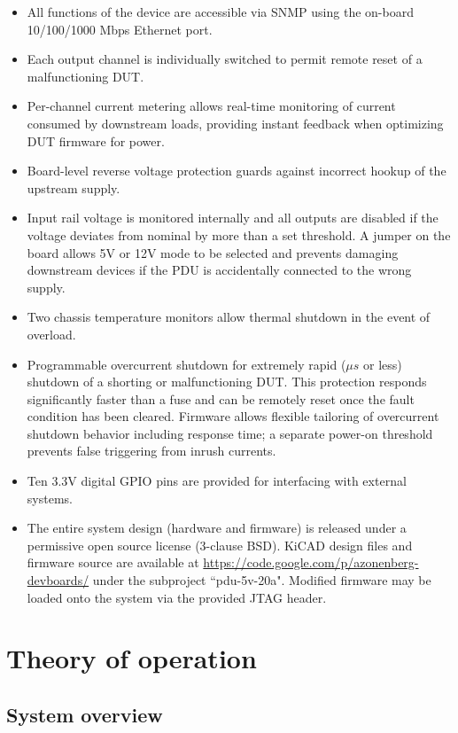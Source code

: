 \documentclass{article}
\begin{document}
\begin{itemize}
\item All functions of the device are accessible via SNMP using the on-board 10/100/1000 Mbps Ethernet port.
\item Each output channel is individually switched to permit remote reset of a malfunctioning DUT.
\item Per-channel current metering allows real-time monitoring of current consumed by downstream loads, providing
instant feedback when optimizing DUT firmware for power.
\item Board-level reverse voltage protection guards against incorrect hookup of the upstream supply.
\item Input rail voltage is monitored internally and all outputs are disabled if the voltage deviates from nominal by 
more than a set threshold. A jumper on the board allows 5V or 12V mode to be selected and prevents damaging downstream 
devices if the PDU is accidentally connected to the wrong supply.
\item Two chassis temperature monitors allow thermal shutdown in the event of overload.
\item Programmable overcurrent shutdown for extremely rapid ($\mu s$ or less) shutdown of a shorting or malfunctioning
DUT. This protection responds significantly faster than a fuse and can be remotely reset once the fault condition has 
been cleared. Firmware allows flexible tailoring of overcurrent shutdown behavior including response time; a separate 
power-on threshold prevents false triggering from inrush currents.
\item Ten 3.3V  digital GPIO pins are provided for interfacing with external systems.
\item The entire system design (hardware and firmware) is released under a permissive open source license (3-clause
BSD). KiCAD design files and firmware source are available at \url{https://code.google.com/p/azonenberg-devboards/}
under the  subproject ``pdu-5v-20a". Modified firmware may be loaded onto the system via the provided JTAG header.
\end{itemize}

\pagebreak
\section{Theory of operation}

\subsection{System overview}
\end{document}
